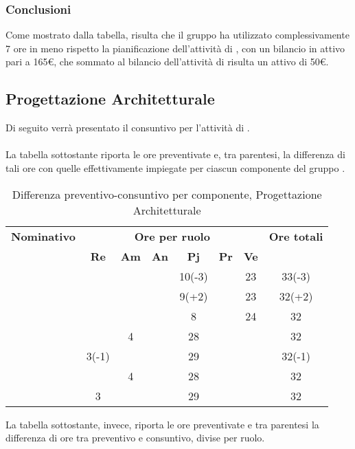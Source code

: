 \subsubsection{Conclusioni}
Come mostrato dalla tabella, risulta che il gruppo ha utilizzato complessivamente 7 ore in meno rispetto la pianificazione dell'attività di \textit{\AD}, con un bilancio in attivo pari a 165€, che sommato al bilancio dell'attività di \textit{\AR} risulta un attivo di 50€.

\newpage
\subsection{Progettazione Architetturale}

Di seguito verrà presentato il consuntivo per l'attività di \textit{\PA}.
\\\\
La tabella sottostante riporta le ore preventivate e, tra parentesi, la differenza di tali ore con quelle effettivamente impiegate per ciascun componente del gruppo \gruppo.

\begin{table}[H]
	\begin{center}
		\begin{tabular}{|c|c|c|c|c|c|c|c|}
			\hline
			\textbf{Nominativo} & \multicolumn{6}{c|}{\textbf{Ore per ruolo}} & \textbf{Ore totali} \\
			& \textbf{Re} & \textbf{Am} & \textbf{An} & \textbf{Pj} & \textbf{Pr} & \textbf{Ve} & \\
			\hline
			\FB			&		&		&		&	10(-3)	&		&	23	&	33(-3)	\\
			\hline
			\AF			&		&		&		&	9(+2) 	&		&	23	& 	32(+2)	\\
			\hline
			\GN			&		&		&		&	8	&		&	24	&	32	\\
			\hline
			\GR			&		&	4	&  		&	28	&	 	& 		&	32	\\
			\hline
			\SM 		&	3(-1)	&		&		&	29	&		& 		&	32(-1)	\\
			\hline
			\MP 		& 		&	4	&		&	28	&		&		&	32	\\
			\hline
			\MV 		&	3	&		&		&	29	&		&		& 	32	\\
			\hline
		\end{tabular}
	\end{center}
	\caption{Differenza preventivo-consuntivo per componente, Progettazione Architetturale}
\end{table}

La tabella sottostante, invece, riporta le ore preventivate e  tra parentesi la differenza di ore tra preventivo e consuntivo, divise per ruolo.

